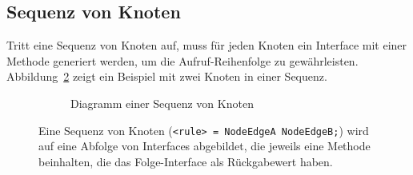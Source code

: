 \documentclass[../InterneDSLs.tex]{subfiles}
\begin{document}
\subsection{Sequenz von Knoten}\label{SEC:Sequence}
Tritt eine Sequenz von Knoten auf, muss für jeden Knoten ein Interface mit einer Methode generiert werden, um die Aufruf-Reihenfolge zu gewährleisten. Abbildung~\ref{FIG:SequenceNode} zeigt ein Beispiel mit zwei Knoten in einer Sequenz.
\begin{figure}[ht]
\centering
  \begin{subfigure}[c]{0.49\textwidth}
    \caption{Diagramm einer Sequenz von Knoten}
    \label{FIG:DiagramSequenceNode}
  \end{subfigure}
  \begin{subfigure}[c]{0.49\textwidth}
    
  \end{subfigure}
  \caption[Abbildung einer Sequenz (\texttt{<rule> = NodeEdgeA NodeEdgeB;})]{Eine Sequenz von Knoten (\texttt{<rule> = NodeEdgeA NodeEdgeB;}) wird auf eine Abfolge von Interfaces abgebildet, die jeweils eine Methode beinhalten, die das Folge-Interface als Rückgabewert haben.}
  \label{FIG:SequenceNode}
\end{figure}
\end{document}
